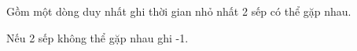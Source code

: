 Gồm một dòng duy nhất ghi thời gian nhỏ nhất 2 sếp có thể gặp nhau.

Nếu 2 sếp không thể gặp nhau ghi -1.

\